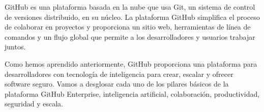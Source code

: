 GitHub es una plataforma basada en la nube que usa Git, un sistema de control de versiones 
distribuido, en su núcleo. La plataforma GitHub simplifica el proceso de colaborar en proyectos
y proporciona un sitio web, herramientas de línea de comandos y un flujo global que permite a
los desarrolladores y usuarios trabajar juntos.

Como hemos aprendido anteriormente, GitHub proporciona una plataforma para desarrolladores con 
tecnología de inteligencia para crear, escalar y ofrecer software seguro. Vamos a desglosar cada 
uno de los pilares básicos de la plataforma GitHub Enterprise, inteligencia artificial, colaboración, 
productividad, seguridad y escala.

